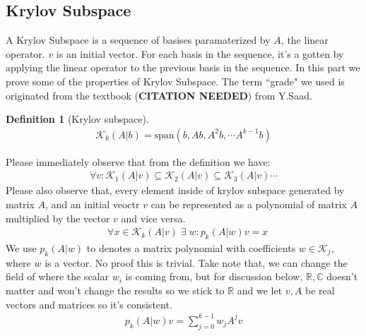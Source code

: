 \documentclass[]{article}
\theoremstyle{definition}
\newtheorem{definition}{Definition}
\begin{document}
    \subsection{Krylov Subspace}
        A Krylov Subspace is a sequence of basises paramaterized by $A$, the linear operator. $v$ is an initial vector. For each basis in the sequence, it's a gotten by applying the linear operator to the previous basis in the sequence. In this part we prove some of the properties of Krylov Subspace. The term ``grade" we used is originated from the textbook (\textbf{CITATION NEEDED}) from Y.Saad. 
        \begin{definition}[Krylov subspace]
            \begin{align}
                \mathcal{K}_k(A|b) = \text{span}( b, Ab, A^2b, \cdots A^{k - 1}b)
            \end{align}
        \end{definition}
        \noindent
        Please immediately observe that from the definition we have: 
        \begin{align}
            \forall v: \mathcal{K}_1(A|v)  \subseteq  \mathcal{K}_2(A|v)  \subseteq \mathcal{K}_3(A|v)  \cdots 
        \end{align}
        Please also observe that, every element inside of krylov subspace generated by matrix $A$, and an initial veoctr $v$ can be represented as a polynomial of matrix $A$ multiplied by the vector $v$ and vice versa.
        \begin{align}
            & \forall x \in \mathcal K_k(A|v) \;\exists\; w: p_k(A|w)v = x
        \end{align}
        We use $p_k(A|w)$ to denotes a matrix polynomial with coefficients $w\in \mathcal K_j$, where $w$ is a vector. No proof this is trivial. Take note that, we can change the field of where the scalar $w_i$ is coming from, but for discussion below, $\mathbb R, \mathbb C$  doesn't matter and won't change the results so we stick to $\mathbb R$ and we let $v, A$ be real vectors and matrices so it's consistent. 
        \begin{align}
            p_k(A|w)v = \sum_{j = 0}^{k - 1}w_jA^jv
        \end{align}
\end{document}

